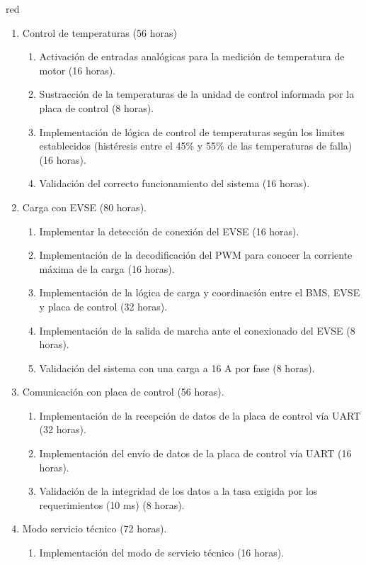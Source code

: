 \documentclass[
11pt, %
codirector, %
]{charter}
\begin{document}
\begin{consigna}{red}
\begin{enumerate}
\begin{enumerate}
		      \end{enumerate}
		\item Control de temperaturas (56 horas)
		      \begin{enumerate}
			      \item Activación de entradas analógicas para la medición de temperatura de motor (16 horas).
			      \item Sustracción de la temperaturas de la unidad de control informada por la placa de control (8 horas).
			      \item Implementación de lógica de control de temperaturas según los limites establecidos (histéresis entre el 45\% y 55\% de las temperaturas de falla) (16 horas).
			      \item Validación del correcto funcionamiento del sistema (16 horas).
		      \end{enumerate}
		\item Carga con EVSE (80 horas).
		      \begin{enumerate}
			      \item Implementar la detección de conexión del EVSE (16 horas).
			      \item Implementación de la decodificación del PWM para conocer la corriente máxima de la carga (16 horas).
			      \item Implementación de la lógica de carga y coordinación entre el BMS, EVSE y placa de control (32 horas).
			      \item Implementación de la salida de marcha ante el conexionado del EVSE (8 horas).
			      \item Validación del sistema con una carga a 16 A por fase (8 horas).
		      \end{enumerate}
		\item Comunicación con placa de control (56 horas).
		      \begin{enumerate}
			      \item Implementación de la recepción de datos de la placa de control vía UART (32 horas).
			      \item Implementación del envío de datos de la placa de control vía UART (16 horas).
			      \item Validación de la integridad de los datos a la tasa exigida por los requerimientos (10 ms) (8 horas).
		      \end{enumerate}
		\item Modo servicio técnico (72 horas).
		      \begin{enumerate}
			      \item Implementación del modo de servicio técnico (16 horas).

\end{enumerate}
\end{enumerate}
\end{consigna}
\end{document}
